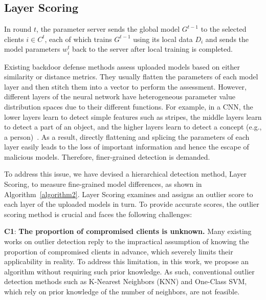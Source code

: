{%

%
\subsection{Layer Scoring}
In round $t$, the parameter server sends the global model $G^{t-1}$ to the selected clients $i\in C^t$, each of which trains $G^{t-1} $ using its local data $D_{i}$ and sends the model parameters $w_{i}^{t}$ back to the server after local training is completed.

Existing backdoor defense methods assess uploaded models based on either similarity or distance metrics. They usually flatten the parameters of each model layer and then stitch them into a vector to perform the assessment. However, different layers of the neural network have heterogeneous parameter value distribution spaces due to their different functions. For example, in a CNN, the lower layers learn to detect simple features such as stripes, the middle layers learn to detect a part of an object, and the higher layers learn to detect a concept (e.g., a person)~\cite{distribution}. As a result, directly flattening and splicing the parameters of each layer easily leads to the loss of important information and hence the escape of malicious models. Therefore, finer-grained detection is demanded.

To address this issue, we have devised a hierarchical detection method, Layer Scoring, to measure fine-grained model differences, as shown in Algorithm~\ref{algorithm2}. Layer Scoring examines and assigns an outlier score to each layer of the uploaded models in turn. To provide accurate scores, the outlier scoring method is crucial and faces the following challenges:

\noindent\textbf{C1}: \textbf{The proportion of compromised clients is unknown.} Many existing works on outlier detection reply to the impractical assumption of knowing the proportion of compromised clients in advance, which severely limits their applicability in reality. To address this limitation, in this work, we propose an algorithm without requiring such prior knowledge. As such, conventional outlier detection methods such as K-Nearest Neighbors (KNN) and One-Class SVM, which rely on prior knowledge of the number of neighbors, are not feasible. 

}
